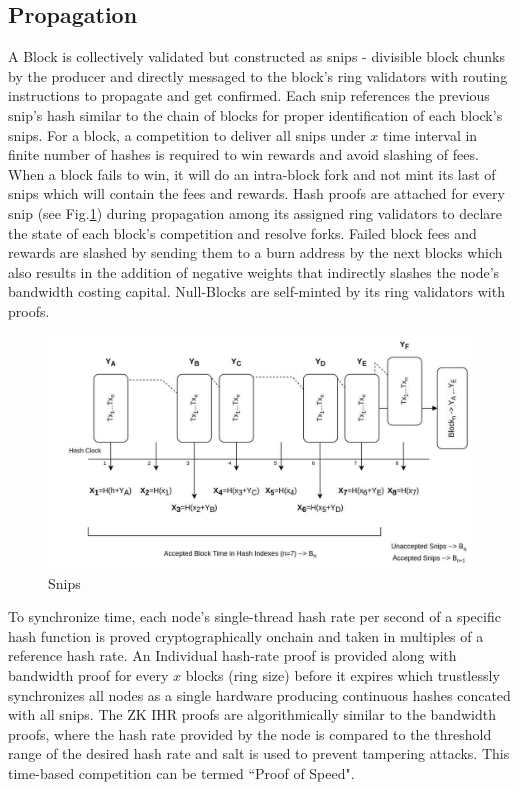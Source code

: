 \documentclass[a4paper,10pt]{article}
\begin{document}
\subsection{Propagation}
A Block is collectively validated but constructed as snips - divisible block chunks by the producer and directly messaged to the block's ring validators with routing instructions to propagate and get confirmed. Each snip references the previous snip's hash similar to the chain of blocks for proper identification of each block's snips. For a block, a competition to deliver all snips under $x$ time interval in finite number of hashes is required to win rewards and avoid slashing of fees. When a block fails to win, it will do an intra-block fork and not mint its last of snips which will contain the fees and rewards. Hash proofs are attached for every snip (see Fig.\ref{snips}) during propagation among its assigned ring validators to declare the state of each block's competition and resolve forks. Failed block fees and rewards are slashed by sending them to a burn address by the next blocks which also results in the addition of negative weights that indirectly slashes the node's bandwidth costing capital. Null-Blocks are self-minted by its ring validators with proofs.
\begin{figure}[H]
\begin{center}
\includegraphics[width=12cm]{Snips}
\caption{Snips}
\label{snips}
\end{center}
\end{figure}

To synchronize time, each node's single-thread hash rate per second of a specific hash function is proved cryptographically onchain and taken in multiples of a reference hash rate. An Individual hash-rate proof is provided along with bandwidth proof for every $x$ blocks (ring size) before it expires which trustlessly synchronizes all nodes as a single hardware producing continuous hashes concated with all snips. The ZK IHR proofs are algorithmically similar to the bandwidth proofs, where the hash rate provided by the node is compared to the threshold range of the desired hash rate and salt is used to prevent tampering attacks. This time-based competition can be termed ``Proof of Speed".
\end{document}
